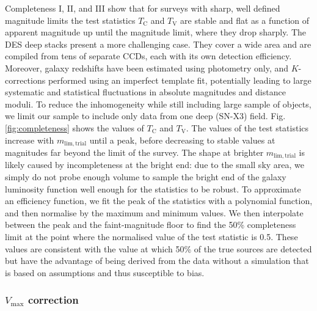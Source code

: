 \documentclass[fleqn,usenatbib]{mnras}
\begin{document}
Completeness I, II, and III show that for surveys with sharp, well defined magnitude limits the test statistics $T_{\mathrm{C}}$ and $T_{\mathrm{V}}$ are stable and flat as a function of apparent magnitude up until the magnitude limit, where they drop sharply. The DES deep stacks present a more challenging case. They cover a wide area and are compiled from tens of separate CCDs, each with its own detection efficiency. Moreover, galaxy redshifts have been estimated using photometry only, and $K$-corrections performed using an imperfect template fit, potentially leading to large systematic and statistical fluctuations in absolute magnitudes and distance moduli. To reduce the inhomogeneity while still including  large sample of objects, we limit our sample to include only data from one deep (SN-X3) field. Fig. \ref{fig:completeness} shows the values of $T_{\mathrm{C}}$ and $T_{\mathrm{V}}$. The values of the test statistics increase with $m_{\mathrm{lim, trial}}$ until a peak, before decreasing to stable values at magnitudes far beyond the limit of the survey. The shape at brighter $m_{\mathrm{lim, trial}}$ is likely caused by incompleteness at the bright end: due to the small sky area, we simply do not probe enough volume to sample the bright end of the galaxy luminosity function well enough for the statistics to be robust. To approximate an efficiency function, we fit the peak of the statistics with a polynomial function, and then normalise by the maximum and minimum values. We then interpolate between the peak and the faint-magnitude floor to find the 50\% completeness limit at the point where the normalised value of the test statistic is 0.5. These values are consistent with the value at which 50\% of the true sources are detected but have the advantage of being derived from the data without a simulation that is based on assumptions and thus susceptible to bias.
\subsubsection{$V_{\mathrm{max}}$ correction \label{subsubsec:vmax_corr}}
\end{document}
